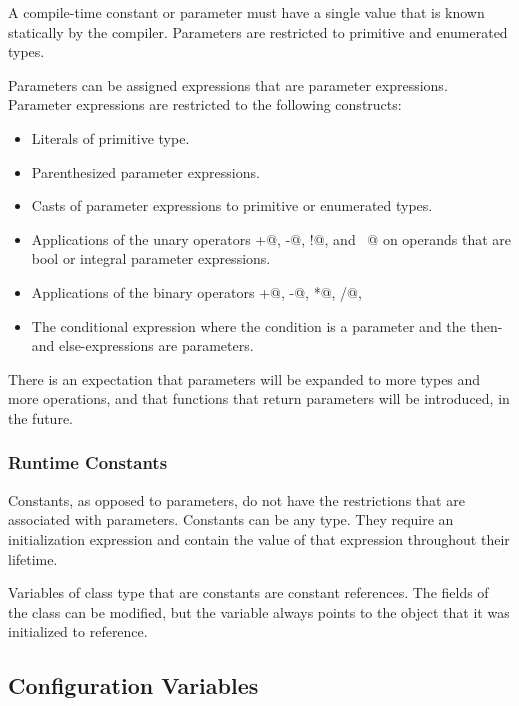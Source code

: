 A compile-time constant or parameter must have a single value that is
known statically by the compiler.  Parameters are restricted to
primitive and enumerated types.

Parameters can be assigned expressions that are parameter expressions.
Parameter expressions are restricted to the following constructs:
\begin{itemize}
\item
 Literals of primitive type.
\item
 Parenthesized parameter expressions.
\item
 Casts of parameter expressions to primitive or enumerated types.
\item
 Applications of the unary operators \verb@+@, \verb@-@, \verb@!@,
 and \verb@~@ on operands that are bool or integral parameter
 expressions.
\item
 Applications of the binary operators \verb@+@, \verb@-@, \verb@*@, \verb@/@, \verb@%@, \verb@**@, \verb@&&@, \verb@||@, \verb@!@, \verb@&@, \verb@|@, \verb@^@, \verb@~@, \verb@<<@, \verb@>>@, \verb@==@, \verb@!=@, \verb@<=@, \verb@>=@, \verb@<@, and \verb@>@ on operands that are bool or integral parameter expressions.
\item
 The conditional expression where the condition is a parameter and the
 then- and else-expressions are parameters.
\end{itemize}

There is an expectation that parameters will be expanded to more types
and more operations, and that functions that return parameters will be
introduced, in the future.

\subsubsection{Runtime Constants}
\label{Runtime_Constants}

Constants, as opposed to parameters, do not have the restrictions that
are associated with parameters.  Constants can be any type.  They
require an initialization expression and contain the value of that
expression throughout their lifetime.

Variables of class type that are constants are constant references.
The fields of the class can be modified, but the variable always
points to the object that it was initialized to reference.

\subsection{Configuration Variables}
\label{Configuration_Variables}

